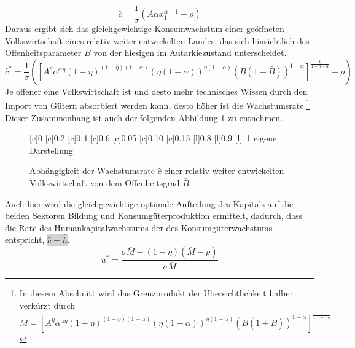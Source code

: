 %
\begin{equation}
	\hat{c}=\frac{1}{\sigma}(A\alpha x_1^{\alpha-1}-\rho)
\end{equation}
%
Daraus ergibt sich das gleichgewichtige Konsumwachstum einer geöffneten Volkswirtschaft eines relativ weiter entwickelten Landes, das sich hinsichtlich des Offenheitsparameter $\bar{B}$ von der hiesigen im Autarkiezustand unterscheidet.
%
\begin{equation}
	\boxed{
		\hat{c}^*=\frac{1}{\sigma}\left(\left[A^\eta\alpha^{\alpha\eta}(1-\eta)^{(1-\eta)(1-\alpha)}(\eta(1-\alpha))^{\eta(1-\alpha)}(B(1+\bar{B}))^{1-\alpha}\right]^\frac{1}{1+\eta-\alpha}-\rho\right)
		}
\end{equation}
%
Je offener eine Volkswirtschaft ist und desto mehr technisches Wissen durch den Import von Gütern absorbiert werden kann, desto höher ist die Wachstumsrate.\footnote{In diesem Abschnitt wird das Grenzprodukt der Übersichtlichkeit halber verkürzt durch $\bar{M}=\left[A^\eta\alpha^{\alpha\eta}(1-\eta)^{(1-\eta)(1-\alpha)}(\eta(1-\alpha))^{\eta(1-\alpha)}(B(1+\bar{B}))^{1-\alpha}\right]^\frac{1}{1+\eta-\alpha}$} Dieser Zusammenhang ist auch der folgenden Abbildung \ref{fig:cDachIL} zu entnehmen. 
% 
\begin{figure}[htb] 
\vspace{0.23cm}
 \centering 
		[c]{\footnotesize{0}}
		[c]{\footnotesize{0.2}}
		[c]{\footnotesize{0.4}}
		[c]{\footnotesize{0.6}}
		[c]{\footnotesize{0.05}}
		[c]{\footnotesize{0.10}}
		[c]{\footnotesize{0.15}}
		[l]{\footnotesize{0.8}}
		[l]{\footnotesize{0.9}}
		[l]{~\footnotesize{1}}
	\hfill{}  eigene Darstellung
	\caption{Abhängigkeit der Wachstumsrate $\hat{c}$ einer relativ weiter entwickelten Volkswirtschaft von dem Offenheitsgrad $\bar{B}$}
	\label{fig:cDachIL}
\end{figure}
%
Auch hier wird die gleichgewichtige optimale Aufteilung des Kapitals auf die beiden Sektoren Bildung und Konsumgüterproduktion ermittelt, dadurch, dass die Rate des Humankapitalwachstums der des Konsumgüterwachstums entspricht, \colorbox{lightgray}{$\hat{c}=\hat{h}$}.
%
\begin{equation}
	\boxed{u^*=\frac{\sigma \bar{M}-(1-\eta)(\bar{M}-\rho)}{\sigma \bar{M}}}
\end{equation}
